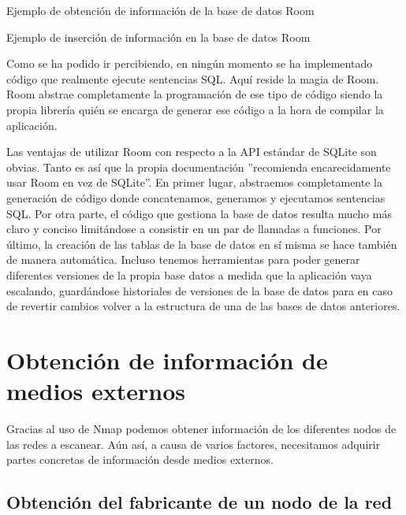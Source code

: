 \begin{code}
	\caption{Ejemplo de obtención de información de la base de datos Room}
	\label{code:roomSelect}
	
\end{code}

\begin{code}
	\caption{Ejemplo de inserción de información en la base de datos Room}
	\label{code:roomInsert}
	
\end{code}

Como se ha podido ir percibiendo, en ningún momento se ha implementado código que realmente ejecute sentencias SQL. Aquí reside la magia de Room. Room abstrae completamente la programación de ese tipo de código siendo la propia librería quién se encarga de generar ese código a la hora de compilar la aplicación.

Las ventajas de utilizar Room con respecto a la API estándar de SQLite son obvias. Tanto es así que la propia documentación ''recomienda encarecidamente usar Room en vez de SQLite''\cite{room-training}. En primer lugar, abstraemos completamente la generación de código donde concatenamos, generamos y ejecutamos sentencias SQL. Por otra parte, el código que gestiona la base de datos resulta mucho más claro y conciso limitándose a consistir en un par de llamadas a funciones. Por último, la creación de las tablas de la base de datos en sí misma se hace también de manera automática. Incluso tenemos herramientas para poder generar diferentes versiones de la propia base datos a medida que la aplicación vaya escalando, guardándose historiales de versiones de la base de datos para en caso de revertir cambios volver a la estructura de una de las bases de datos anteriores.

\section{Obtención de información de medios externos}

Gracias al uso de Nmap podemos obtener información de los diferentes nodos de las redes a escanear. Aún así, a causa de varios factores, necesitamos adquirir partes concretas de información desde medios externos.

\subsection{Obtención del fabricante de un nodo de la red}

